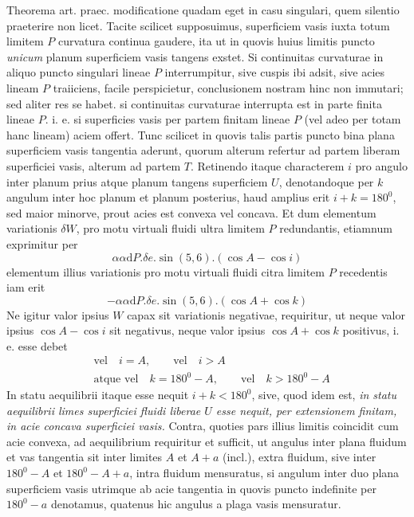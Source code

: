 Theorema art. praec. modificatione quadam eget in casu singulari, quem silentio praeterire non licet. Tacite scilicet supposuimus, superficiem vasis iuxta totum limitem $P$ curvatura continua gaudere, ita ut in quovis huius limitis puncto \textit{unicum} planum superficiem vasis tangens exstet. Si continuitas curvaturae in aliquo puncto singulari lineae $P$ interrumpitur, sive cuspis ibi adsit, sive acies lineam $P$ traiiciens, facile perspicietur, conclusionem nostram hinc non immutari; sed aliter res se habet. si continuitas curvaturae interrupta est in parte finita lineae $P$. i. e. si superficies vasis per partem finitam lineae $P$ (vel adeo per totam hanc lineam) aciem offert. Tunc scilicet in quovis talis partis puncto bina plana
superficiem vasis tangentia aderunt, quorum alterum refertur ad partem liberam superficiei vasis, alterum ad partem $T$. Retinendo itaque characterem $i$ pro angulo inter planum prius atque planum tangens superficiem $U$, denotandoque per $k$ angulum inter hoc planum et planum posterius, haud amplius erit $i+k=180^0$, sed maior minorve, prout acies est convexa vel concava. Et dum elementum variationis $\delta W$, pro motu virtuali fluidi ultra limitem $P$ redundantis, etiamnum exprimitur per
\[
\alpha\alpha\mathrm{d}P.\delta e.\sin(5,6).(\cos A-\cos i)
\]
elementum illius variationis pro motu virtuali fluidi citra limitem $P$ recedentis iam erit
\[
-\alpha\alpha\mathrm{d}P.\delta e.\sin(5,6).(\cos A+\cos k)
\]
Ne igitur valor ipsius $W$ capax sit variationis negativae, requiritur, ut neque valor ipsius $\cos A-\cos i$ sit negativus, neque valor ipsius $\cos A+\cos k$ positivus, i. e. esse debet
\[
\begin{aligned}
&\text{vel}\quad i=A,\qquad\text{vel}\quad i>A\\
&\text{atque vel}\quad k=180^0-A,\qquad\text{vel}\quad k>180^0-A
\end{aligned}
\]
In statu aequilibrii itaque esse nequit $i+k<180^0$, sive, quod idem est, \textit{in statu aequilibrii limes superficiei fluidi liberae $U$ esse nequit, per extensionem finitam, in acie concava superficiei vasis.} Contra, quoties pars illius limitis coincidit cum acie convexa, ad aequilibrium requiritur et sufficit, ut angulus inter plana fluidum et vas tangentia sit inter limites $A$ et $A+a$ (incl.), extra fluidum, sive inter $180^0-A$ et $180^0-A+a$, intra fluidum mensuratus, si angulum inter duo plana superficiem vasis utrimque ab acie tangentia in quovis puncto indefinite per $180^0-a$ denotamus, quatenus hic angulus a plaga vasis mensuratur.

